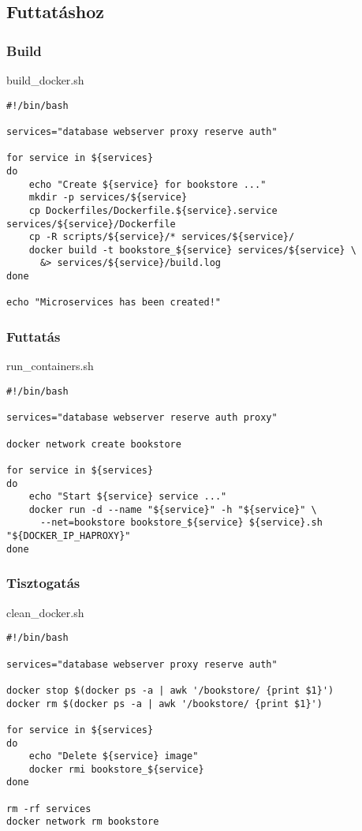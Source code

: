 \subsection{Futtatáshoz}\label{futtatuxe1shoz}

\subsubsection{Build}\label{build}

build\_docker.sh

\begin{verbatim}
#!/bin/bash

services="database webserver proxy reserve auth"

for service in ${services}
do
    echo "Create ${service} for bookstore ..."
    mkdir -p services/${service}
    cp Dockerfiles/Dockerfile.${service}.service services/${service}/Dockerfile
    cp -R scripts/${service}/* services/${service}/
    docker build -t bookstore_${service} services/${service} \
      &> services/${service}/build.log
done

echo "Microservices has been created!"
\end{verbatim}

\subsubsection{Futtatás}\label{futtatuxe1s}

run\_containers.sh

\begin{verbatim}
#!/bin/bash

services="database webserver reserve auth proxy"

docker network create bookstore

for service in ${services}
do
    echo "Start ${service} service ..."
    docker run -d --name "${service}" -h "${service}" \
      --net=bookstore bookstore_${service} ${service}.sh "${DOCKER_IP_HAPROXY}"
done
\end{verbatim}

\subsubsection{Tisztogatás}\label{tisztogatuxe1s}

clean\_docker.sh

\begin{verbatim}
#!/bin/bash

services="database webserver proxy reserve auth"

docker stop $(docker ps -a | awk '/bookstore/ {print $1}')
docker rm $(docker ps -a | awk '/bookstore/ {print $1}')

for service in ${services}
do
    echo "Delete ${service} image"
    docker rmi bookstore_${service}
done

rm -rf services
docker network rm bookstore
\end{verbatim}

